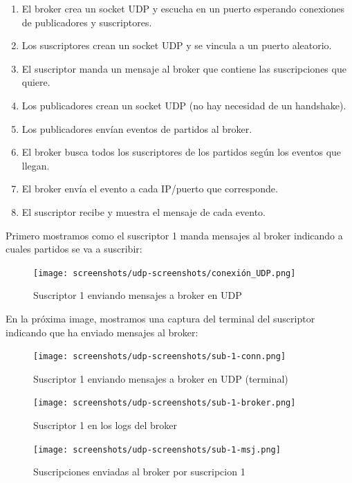 \documentclass[10pt]{article}
\begin{document}
\begin{enumerate}
    \item El broker crea un socket UDP y escucha en un puerto esperando conexiones de publicadores y suscriptores. 
    \item Los suscriptores crean un socket UDP y se vincula a un puerto aleatorio.
    \item El suscriptor manda un mensaje al broker que contiene las suscripciones que quiere.
    \item Los publicadores crean un socket UDP (no hay necesidad de un handshake).
    \item Los publicadores envían eventos de partidos al broker.
    \item El broker busca todos los suscriptores de los partidos según los eventos que llegan.
    \item El broker envía el evento a cada IP/puerto que corresponde.
    \item El suscriptor recibe y muestra el mensaje de cada evento.
\end{enumerate}

Primero mostramos como el suscriptor 1 manda mensajes al broker indicando a cuales partidos se va a suscribir:



\begin{figure}[H]
    \centering
    \texttt{[image: screenshots/udp-screenshots/conexión\_UDP.png]}
    \caption{Suscriptor 1 enviando mensajes a broker en UDP}
\end{figure} 

En la próxima image, mostramos una captura del terminal del suscriptor indicando que ha enviado mensajes al broker:

\begin{figure}[H]
    \centering
    \texttt{[image: screenshots/udp-screenshots/sub-1-conn.png]}
    \caption{Suscriptor 1 enviando mensajes a broker en UDP (terminal)}
\end{figure} 

\begin{figure}[H]
    \centering
    \texttt{[image: screenshots/udp-screenshots/sub-1-broker.png]}
    \caption{Suscriptor 1 en los logs del broker}
\end{figure} 

\begin{figure}[H]
    \centering
    \texttt{[image: screenshots/udp-screenshots/sub-1-msj.png]}
    \caption{Suscripciones enviadas al broker por suscripcion 1}
\end{figure} 
\end{document}
